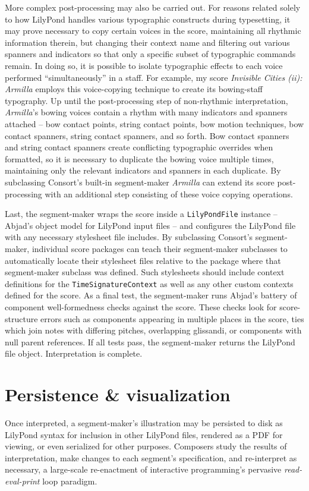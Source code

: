 More complex post-processing may also be carried out. For reasons related
solely to how LilyPond handles various typographic constructs during
typesetting, it may prove necessary to copy certain voices in the score,
maintaining all rhythmic information therein, but changing their context name
and filtering out various spanners and indicators so that only a specific
subset of typographic commands remain. In doing so, it is possible to isolate
typographic effects to each voice performed \enquote{simultaneously} in a
staff. For example, my score \emph{Invisible Cities (ii): Armilla} employs this
voice-copying technique to create its bowing-staff typography. Up until the
post-processing step of non-rhythmic interpretation, \emph{Armilla}'s bowing
voices contain a rhythm with many indicators and spanners attached -- bow
contact points, string contact points, bow motion techniques, bow contact
spanners, string contact spanners, and so forth. Bow contact spanners and
string contact spanners create conflicting typographic overrides when
formatted, so it is necessary to duplicate the bowing voice multiple times,
maintaining only the relevant indicators and spanners in each duplicate. By
subclassing Consort's built-in segment-maker \emph{Armilla} can extend its
score post-processing with an additional step consisting of these voice copying
operations.

Last, the segment-maker wraps the score inside a \texttt{LilyPondFile} instance
-- Abjad's object model for LilyPond input files -- and configures the LilyPond
file with any necessary stylesheet file includes. By subclassing Consort's
segment-maker, individual score packages can teach their segment-maker
subclasses to automatically locate their stylesheet files relative to the
package where that segment-maker subclass was defined. Such stylesheets should
include context definitions for the \texttt{TimeSignatureContext} as well as
any other custom contexts defined for the score. As a final test, the
segment-maker runs Abjad's battery of component well-formedness checks against
the score. These checks look for score-structure errors such as components
appearing in multiple places in the score, ties which join notes with differing
pitches, overlapping glissandi, or components with null parent references. If
all tests pass, the segment-maker returns the LilyPond file object.
Interpretation is complete.

\section{Persistence \& visualization}

Once interpreted, a segment-maker's illustration may be persisted to disk as
LilyPond syntax for inclusion in other LilyPond files, rendered as a PDF for
viewing, or even serialized for other purposes. Composers study the results of
interpretation, make changes to each segment's specification, and re-interpret
as necessary, a large-scale re-enactment of interactive programming's pervasive
\emph{read-eval-print} loop paradigm.